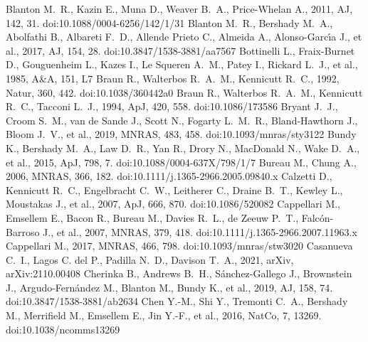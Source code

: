 \documentclass[fleqn,usenatbib]{mnras}
\begin{document}
\begin{thebibliography}{}
 Blanton M.~R., Kazin E., Muna D., Weaver B.~A., Price-Whelan A., 2011, AJ, 142, 31. doi:10.1088/0004-6256/142/1/31
 Blanton M.~R., Bershady M.~A., Abolfathi B., Albareti F.~D., Allende Prieto C., Almeida A., Alonso-Garc{\'\i}a J., et al., 2017, AJ, 154, 28. doi:10.3847/1538-3881/aa7567
 Bottinelli L., Fraix-Burnet D., Gouguenheim L., Kazes I., Le Squeren A.~M., Patey I., Rickard L.~J., et al., 1985, A\&A, 151, L7
 Braun R., Walterbos R.~A.~M., Kennicutt R.~C., 1992, Natur, 360, 442. doi:10.1038/360442a0
 Braun R., Walterbos R.~A.~M., Kennicutt R.~C., Tacconi L.~J., 1994, ApJ, 420, 558. doi:10.1086/173586
 Bryant J.~J., Croom S.~M., van de Sande J., Scott N., Fogarty L.~M.~R., Bland-Hawthorn J., Bloom J.~V., et al., 2019, MNRAS, 483, 458. doi:10.1093/mnras/sty3122
 Bundy K., Bershady M.~A., Law D.~R., Yan R., Drory N., MacDonald N., Wake D.~A., et al., 2015, ApJ, 798, 7. doi:10.1088/0004-637X/798/1/7
 Bureau M., Chung A., 2006, MNRAS, 366, 182. doi:10.1111/j.1365-2966.2005.09840.x
 Calzetti D., Kennicutt R.~C., Engelbracht C.~W., Leitherer C., Draine B.~T., Kewley L., Moustakas J., et al., 2007, ApJ, 666, 870. doi:10.1086/520082
 Cappellari M., Emsellem E., Bacon R., Bureau M., Davies R.~L., de Zeeuw P.~T., Falc{\'o}n-Barroso J., et al., 2007, MNRAS, 379, 418. doi:10.1111/j.1365-2966.2007.11963.x
 Cappellari M., 2017, MNRAS, 466, 798. doi:10.1093/mnras/stw3020
 Casanueva C.~I., Lagos C. del P., Padilla N.~D., Davison T.~A., 2021, arXiv, arXiv:2110.00408
 Cherinka B., Andrews B.~H., S{\'a}nchez-Gallego J., Brownstein J., Argudo-Fern{\'a}ndez M., Blanton M., Bundy K., et al., 2019, AJ, 158, 74. doi:10.3847/1538-3881/ab2634
 Chen Y.-M., Shi Y., Tremonti C.~A., Bershady M., Merrifield M., Emsellem E., Jin Y.-F., et al., 2016, NatCo, 7, 13269. doi:10.1038/ncomms13269

\end{thebibliography}
\end{document}
